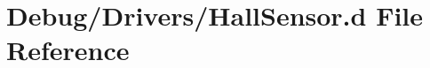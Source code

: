 \hypertarget{_hall_sensor_8d}{}\section{Debug/\+Drivers/\+Hall\+Sensor.d File Reference}
\label{_hall_sensor_8d}
